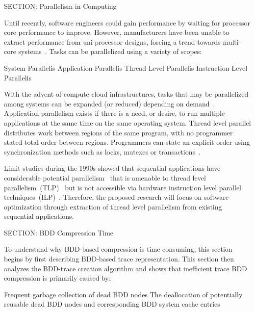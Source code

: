 {SECTION: Parallelism in Computing


Until recently, software engineers could gain performance by waiting for processor core performance to improve.  However, manufacturers have been unable to extract performance from uni-processor designs, forcing a trend towards multi-core systems~\cite{sutter:05:ddj}. Tasks can be parallelized using a variety of scopes:

\begin{itemize} System Parallelis
 Application Parallelis
 Thread Level Parallelis
 Instruction Level Parallelis
 \end{itemize}

With the advent of compute cloud infrastructures, tasks that may be parallelized among systems can be expanded (or reduced) depending on demand~\cite{nurmi:09:ccgrid}.  Application parallelism exists if there is a need, or desire, to run multiple applications at the same time on the same operating system.  Thread level parallel distributes work between regions of the same program, with no programmer stated total order between regions.  Programmers can state an explicit order using synchronization methods such as locks, mutexes or transactions~\cite{larus:tmbook:mcp:2006, gottschlich:10:cgo}.

Limit studies during the 1990s showed that sequential applications have considerable potential parallelism~\cite{lam:92:isca, wall:93:decwrl, austin:92:isca, postiff:98:um} that is amenable to thread level parallelism~(TLP)~\cite{iyer:05:epic} but is not accessible via hardware instruction level parallel techniques~(ILP)~\cite{wall:93:decwrl}. Therefore, the proposed research will focus on software optimization through extraction of thread level parallelism from existing sequential applications.


SECTION: BDD Compression Time


To understand why BDD-based compression is time consuming, this section begins by first describing BDD-based trace representation\cite{price:06:cal}. This section then analyzes the BDD-trace creation algorithm and shows that inefficient trace BDD compression is primarily caused by:

\begin{itemize} Frequent garbage collection of dead BDD nodes
 The deallocation of potentially reusable dead BDD nodes and
 corresponding BDD system cache entries \end{itemize}

}
